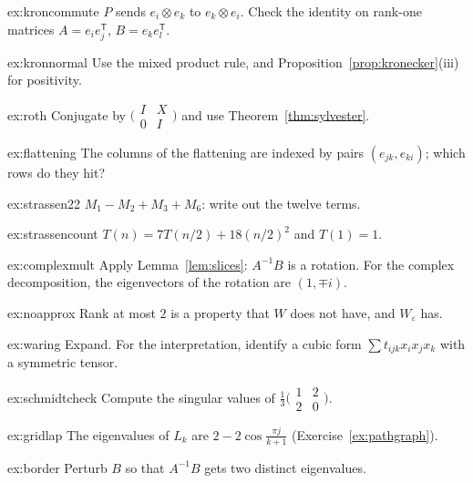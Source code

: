 \begin{hint}{ex:kroncommute}
$P$ sends $e_i\otimes e_k$ to $e_k\otimes e_i$. Check the identity on rank-one matrices $A=e_ie_j^{\mathsf T}$, $B=e_ke_l^{\mathsf T}$.
\end{hint}
\begin{hint}{ex:kronnormal}
Use the mixed product rule, and Proposition~\ref{prop:kronecker}(iii) for positivity.
\end{hint}
\begin{hint}{ex:roth}
Conjugate by $\bigl(\begin{smallmatrix}I&X\\0&I\end{smallmatrix}\bigr)$ and use Theorem~\ref{thm:sylvester}.
\end{hint}
\begin{hint}{ex:flattening}
The columns of the flattening are indexed by pairs $(e_{jk},e_{ki})$; which rows do they hit?
\end{hint}
\begin{hint}{ex:strassen22}
$M_1-M_2+M_3+M_6$: write out the twelve terms.
\end{hint}
\begin{hint}{ex:strassencount}
$T(n)=7T(n/2)+18(n/2)^2$ and $T(1)=1$.
\end{hint}
\begin{hint}{ex:complexmult}
Apply Lemma~\ref{lem:slices}: $A^{-1}B$ is a rotation. For the complex decomposition, the eigenvectors of the rotation are $(1,\mp i)$.
\end{hint}
\begin{hint}{ex:noapprox}
Rank at most $2$ is a property that $W$ does not have, and $W_\varepsilon$ has.
\end{hint}
\begin{hint}{ex:waring}
Expand. For the interpretation, identify a cubic form $\sum t_{ijk}x_ix_jx_k$ with a symmetric tensor.
\end{hint}
\begin{hint}{ex:schmidtcheck}
Compute the singular values of $\frac13\bigl(\begin{smallmatrix}1&2\\2&0\end{smallmatrix}\bigr)$.
\end{hint}
\begin{hint}{ex:gridlap}
The eigenvalues of $L_k$ are $2-2\cos\frac{\pi j}{k+1}$ (Exercise~\ref{ex:pathgraph}).
\end{hint}
\begin{hint}{ex:border}
Perturb $B$ so that $A^{-1}B$ gets two distinct eigenvalues.
\end{hint}

